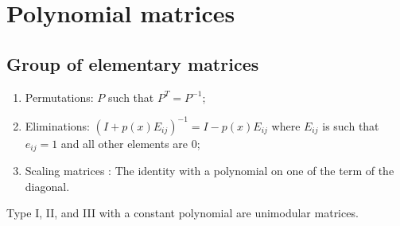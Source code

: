 \documentclass[12pt, openany]{report}
\theoremstyle{definition}
\begin{document}
\chapter{Polynomial matrices}
\section{Group of elementary matrices}
\begin{enumerate}
    \item Permutations: $P$ such that $P^T = P^{-1}$;
    \item Eliminations: $(I+p(x) E_{ij})^{-1} = I-p(x)E_{ij}$ where $E_{ij}$ is such that $e_{ij} = 1$ and all other elements are 0;
    \item Scaling matrices : The identity with a polynomial on one of the term of the diagonal. 
\end{enumerate}
Type I, II, and III with a constant polynomial are unimodular matrices. \\
\end{document}
